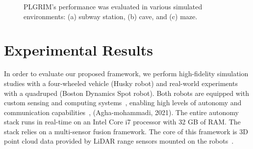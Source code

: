 \documentclass[letterpaper]{article} %
\newcommand{\ph}[1]{{\textbf{#1}:}} %
\begin{document}
\begin{figure}
\centering
\caption{PLGRIM's performance was evaluated in various simulated environments: (a) subway station, (b) cave, and (c) maze.}
\label{fig:maps_of_cave}
\end{figure}




\section{Experimental Results}\label{sec:exp_results}
In order to evaluate our proposed framework, we perform high-fidelity simulation studies with a four-wheeled vehicle (Husky robot) and real-world experiments with a quadruped (Boston Dynamics Spot robot). Both robots are equipped with custom sensing and computing systems~\cite{AutoSpot}, enabling high levels of autonomy and communication capabilities~\cite{Otsu2020}, (Agha-mohammadi, 2021). The entire autonomy stack runs in real-time on an Intel Core i7 processor with 32 GB of RAM. The stack relies on a multi-sensor fusion framework. The core of this framework is 3D point cloud data provided by LiDAR range sensors mounted on the robots~\cite{Ebadi2020}.
\end{document}
